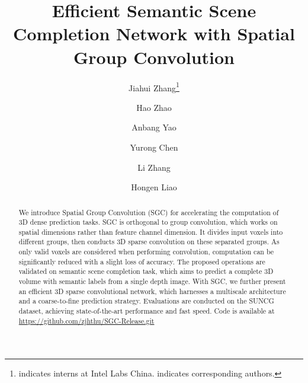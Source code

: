 \documentclass[runningheads]{llncs}
\begin{document}
\title{Efficient Semantic Scene Completion Network with Spatial Group Convolution}




\author{Jiahui Zhang\thanks{indicates interns at Intel Labs China.  indicates corresponding authors.} 
\and
Hao Zhao  \and
Anbang Yao \and
Yurong Chen \and
Li Zhang \and
Hongen Liao
}



\maketitle              \begin{abstract}
We introduce Spatial Group Convolution (SGC) for accelerating the computation of 3D dense prediction tasks. SGC is orthogonal to group convolution, which works on spatial dimensions rather than feature channel dimension. It divides input voxels into different groups, then conducts 3D sparse convolution on these separated groups. As only valid voxels are considered when performing convolution, computation can be significantly reduced with a slight loss of accuracy. The proposed operations are validated on semantic scene completion task, which aims to predict a complete 3D volume with semantic labels from a single depth image. With SGC, we further present an efficient 3D sparse convolutional network, which harnesses a multiscale architecture and a coarse-to-fine prediction strategy. Evaluations are conducted on the SUNCG dataset, achieving state-of-the-art performance and fast speed. Code is available at \url{https://github.com/zjhthu/SGC-Release.git}
\end{abstract}
\end{document}
